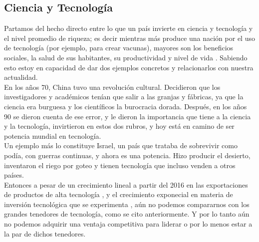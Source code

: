 \documentclass[10pt]{book}
\begin{document}
\begin{multicols}{2}
\subsection*{Ciencia y Tecnología}
Partamos del hecho directo entre lo que un país invierte en ciencia y tecnología y el nivel promedio de riqueza; es decir mientras más produce una nación por el uso de tecnología (por ejemplo, para crear vacunas), mayores son los beneficios sociales, la salud de sus habitantes, su productividad y nivel de vida \cite{cinco}. Sabiendo esto estoy en capacidad de dar dos ejemplos concretos y relacionarlos con nuestra actualidad.\\
En los años 70, China tuvo una revolución cultural. Decidieron que los investigadores y académicos tenían que salir a las granjas y fábricas, ya que la ciencia era burguesa y los científicos la burocracia dorada. Después, en los años 90 se dieron cuenta de ese error, y le dieron la importancia que tiene a la ciencia y la tecnología, invirtieron en estos dos rubros, y hoy está en camino de ser potencia mundial en tecnología.\\
Un ejemplo más lo constituye Israel, un país que trataba de sobrevivir como podía, con guerras continuas, y ahora es una potencia. Hizo producir el desierto, inventaron el riego por goteo y tienen tecnología que incluso venden a otros países.\\
Entonces a pesar de un crecimiento lineal a partir del 2016 en las exportaciones de productos de alta tecnología \cite{seis}, y el crecimiento exponecial en materia de inversión tecnológica que se experimenta \cite{siete}, aún no podemos compararnos con los grandes tenedores de tecnología, como se cito anteriormente. Y por lo tanto aún no podemos adquirir una ventaja competitiva para liderar o por lo menos estar a la par de dichos tenedores.  



\end{multicols}
\end{document}
